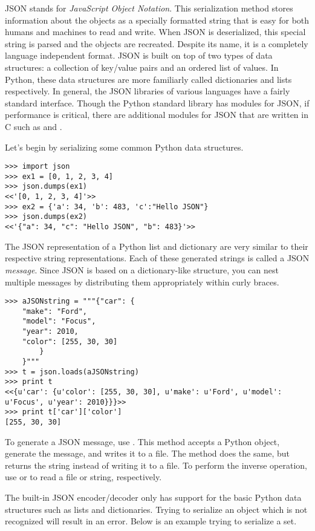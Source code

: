 JSON stands for \emph{JavaScript Object Notation}.
This serialization method stores information about the objects as a specially formatted string that is easy for both humans and machines to read and write.
When JSON is deserialized, this special string is parsed and the objects are recreated.
Despite its name, it is a completely language independent format.
JSON is built on top of two types of data structures: a collection of key/value pairs and an ordered list of values.
In Python, these data structures are more familiarly called dictionaries and lists respectively.
In general, the JSON libraries of various languages have a fairly standard interface.
Though the Python standard library has modules for JSON, if performance is critical, there are additional modules for JSON that are written in C such as  and .

Let's begin by serializing some common Python data structures.
\begin{lstlisting}
>>> import json
>>> ex1 = [0, 1, 2, 3, 4]
>>> json.dumps(ex1)
<<'[0, 1, 2, 3, 4]'>>
>>> ex2 = {'a': 34, 'b': 483, 'c':"Hello JSON"}
>>> json.dumps(ex2)
<<'{"a": 34, "c": "Hello JSON", "b": 483}'>>
\end{lstlisting}

The JSON representation of a Python list and dictionary are very similar to their respective string representations.
Each of these generated strings is called a JSON \emph{message}.
Since JSON is based on a dictionary-like structure, you can nest multiple messages by distributing them appropriately within curly braces.

\begin{lstlisting}
>>> aJSONstring = """{"car": {
    "make": "Ford",
    "model": "Focus",
    "year": 2010,
    "color": [255, 30, 30]
        }
    }"""
>>> t = json.loads(aJSONstring)
>>> print t
<<{u'car': {u'color': [255, 30, 30], u'make': u'Ford', u'model': u'Focus', u'year': 2010}}}>>
>>> print t['car']['color']
[255, 30, 30]
\end{lstlisting}

To generate a JSON message, use .
This method accepts a Python object, generate the message, and writes it to a file.
The method  does the same, but returns the string instead of writing it to a file.
To perform the inverse operation, use  or  to read a file or string, respectively.

The built-in JSON encoder/decoder only has support for the basic Python data structures such as lists and dictionaries.
Trying to serialize an object which is not recognized will result in an error. Below is an example trying to serialize a set.

